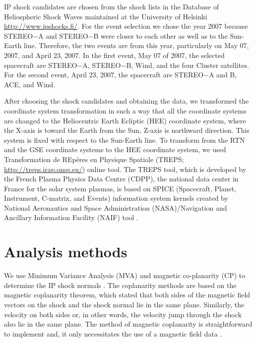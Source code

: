 \documentclass[draft]{agujournal2019}
\begin{document}
IP shock candidates are chosen from the shock lists in the Database of Heliospheric Shock Waves maintained at the University of Helsinki \url{http://www.ipshocks.fi/}. For the event selection we chose the year 2007 because STEREO$-$A and STEREO$-$B were closer to each other as well as to the Sun-Earth line. Therefore, the two events are from this year, particularly on May 07, 2007, and April 23, 2007. In the first event, May 07 of 2007, the selected spacecraft are STEREO$-$A, STEREO$-$B, Wind, and the four Cluster satellites.  For the second event, April 23, 2007, the spacecraft are STEREO$-$A and B, ACE, and Wind.

After choosing the shock candidates and obtaining the data, we transformed the coordinate system transformation in such a way that all the coordinate systems are changed to the Heliocentric Earth Ecliptic (HEE) coordinate system, where the X-axis is toward the Earth from the Sun, Z-axis is northward direction. This system is fixed with respect to the Sun-Earth line. To transform from the RTN and the GSE coordinate systems to the HEE coordinate system, we used Transformation de REp{\`e}res en Physique Spatiale (TREPS; \url{http://treps.irap.omp.eu/}) online tool. The TREPS tool, which is developed by the French Plasma Physics Data Centre (CDPP), the national data center in France for the solar system plasmas, is based on SPICE (Spacecraft, Planet, Instrument, C-matrix, and Events) information system kernels created by National Aeronautics and Space Administration (NASA)/Navigation and Ancillary Information Facility (NAIF) tool \cite{genot18:_treps}.


\section{Analysis methods}
\label{sec:methods}

We use Minimum Variance Analysis (MVA) and magnetic co-planarity (CP) to determine the IP shock normals \cite{sonnerup98:_minim_maxim_varian_analy, schwartz98:_shock_discon_normal_mach_number_relat_param}. The coplanarity methods are based on the magnetic coplanarity theorem, which stated that both sides of the magnetic field vectors on the shock and the shock normal lie in the same plane. Similarly, the velocity on both sides or, in other words, the velocity jump through the shock also lie in the same plane. The method of magnetic coplanarity is straightforward to implement and, it only necessitates the use of a magnetic field data \cite{paschmann98:_analy_method_multi_spacec_data}.
\end{document}
